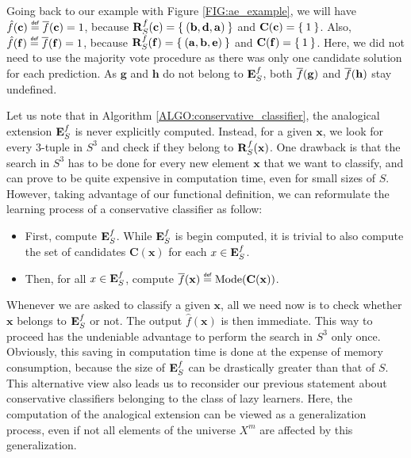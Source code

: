 \begin{testexample}
Going
back to our example with Figure \ref{FIG:ae_example}, we will have
$\hat{f}(\mathbf{c}) \eqdef \albl{\mathbf{c}} = 1$, because
$\mathbf{R}_{S}^{f}(\mathbf{c}) = \Set{(\mathbf{b}, \mathbf{d},\mathbf{a})}$ and
$\mathbf{C}(\mathbf{c}) = \Set{1}$. Also, $\hat{f}(\mathbf{f}) \eqdef
\albl{\mathbf{f}} = 1$, because $\mathbf{R}_{S}^{f}(\mathbf{f}) =
\Set{(\mathbf{a},\mathbf{b},\mathbf{e})}$ and $\mathbf{C}(\mathbf{f}) =
\Set{1}$. Here, we did not need to use the majority vote procedure as there was
only one candidate solution for each prediction. As $\mathbf{g}$ and
$\mathbf{h}$ do not belong to $\mathbf{E}_{S}^{f}$, both $\overline{f}(\mathbf{g})$ and
$\overline{f}(\mathbf{h})$ stay undefined.
\end{testexample}

Let us note that in Algorithm \ref{ALGO:conservative_classifier}, the
analogical extension $\mathbf{E}_{S}^{f}$ is never explicitly computed. Instead, for a given
$\mathbf{x}$, we look for
every 3-tuple in $S^3$ and check if they belong to $\mathbf{R}_{S}^{f}(\mathbf{x})$. One drawback is
that the search in $S^3$ has to be done for every new element $\mathbf{x}$ that
we want to classify, and can prove to be quite expensive in computation time,
even for small sizes of $S$. However, taking advantage of our functional
definition, we can reformulate the learning process of a conservative
classifier as follow:

\begin{itemize}
\item First, compute $\mathbf{E}_{S}^{f}$. While $\mathbf{E}_{S}^{f}$ is begin computed, it is trivial to
  also compute the set of candidates $\mathbf{C}(\mathbf{x})$ for each $x \in
    \mathbf{E}_{S}^{f}$.
  \item Then, for all $x \in\mathbf{E}_{S}^{f}$, compute
    $\albl{\mathbf{x}} \eqdef \text{Mode}(\mathbf{C}(\mathbf{x}))$.
\end{itemize}
\noindent
Whenever we are asked to classify a given $\mathbf{x}$, all we need now is to
check whether $\mathbf{x}$ belongs to $\mathbf{E}_{S}^{f}$ or not. The output
$\hat{f}(\mathbf{x})$ is then immediate. This way to proceed has the undeniable
advantage to perform the search in $S^3$ only once. Obviously, this saving in
computation time is done at the expense of memory consumption, because the
size of $\mathbf{E}_{S}^{f}$ can be drastically greater than that of $S$. This alternative
view also leads us to reconsider our previous statement about conservative
classifiers belonging to the class of lazy learners. Here, the computation of
the analogical extension can be viewed as a generalization process, even if not
all elements of the universe $X^m$ are affected by this generalization.


